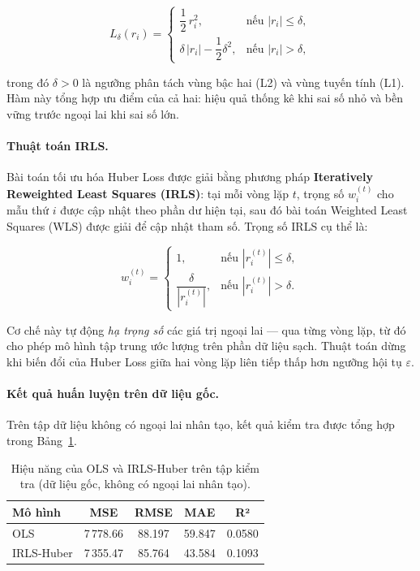 \begin{equation}
    L_\delta(r_i) =
    \begin{cases}
        \dfrac{1}{2}\,r_i^2, & \text{nếu } |r_i| \le \delta, \\[6pt]
        \delta\,|r_i| - \dfrac{1}{2}\delta^2, & \text{nếu } |r_i| > \delta,
    \end{cases}
    \label{eq:huber_loss}
\end{equation}

\noindent trong đó $\delta > 0$ là ngưỡng phân tách vùng bậc hai (L2) và vùng tuyến tính (L1). Hàm này tổng hợp ưu điểm của cả hai: hiệu quả thống kê khi sai số nhỏ và bền vững trước ngoại lai khi sai số lớn.

\paragraph{Thuật toán IRLS.}
Bài toán tối ưu hóa Huber Loss được giải bằng phương pháp \textbf{Iteratively Reweighted Least Squares (IRLS)}: tại mỗi vòng lặp $t$, trọng số $w_i^{(t)}$ cho mẫu thứ $i$ được cập nhật theo phần dư hiện tại, sau đó bài toán Weighted Least Squares (WLS) được giải để cập nhật tham số. Trọng số IRLS cụ thể là:

\begin{equation}
    w_i^{(t)} =
    \begin{cases}
        1, & \text{nếu } |r_i^{(t)}| \le \delta, \\[4pt]
        \dfrac{\delta}{|r_i^{(t)}|}, & \text{nếu } |r_i^{(t)}| > \delta.
    \end{cases}
    \label{eq:irls_weight}
\end{equation}

\noindent Cơ chế này tự động \emph{hạ trọng số} các giá trị ngoại lai — qua từng vòng lặp, từ đó cho phép mô hình tập trung ước lượng trên phần dữ liệu sạch. Thuật toán dừng khi biến đổi của Huber Loss giữa hai vòng lặp liên tiếp thấp hơn ngưỡng hội tụ $\varepsilon$.

\paragraph{Kết quả huấn luyện trên dữ liệu gốc.}
Trên tập dữ liệu không có ngoại lai nhân tạo, kết quả kiểm tra được tổng hợp trong Bảng~\ref{tab:baseline_metrics}.

\begin{table}[htbp]
\centering
\caption{Hiệu năng của OLS và IRLS-Huber trên tập kiểm tra (dữ liệu gốc, không có ngoại lai nhân tạo).}
\label{tab:baseline_metrics}
\begin{tabular}{lcccc}
\toprule
\textbf{Mô hình} & \textbf{MSE} & \textbf{RMSE} & \textbf{MAE} & \textbf{R²} \\
\midrule
OLS          & 7\,778.66 & 88.197 & 59.847 & 0.0580 \\
IRLS-Huber   & 7\,355.47 & 85.764 & 43.584 & 0.1093 \\
\bottomrule
\end{tabular}
\end{table}

